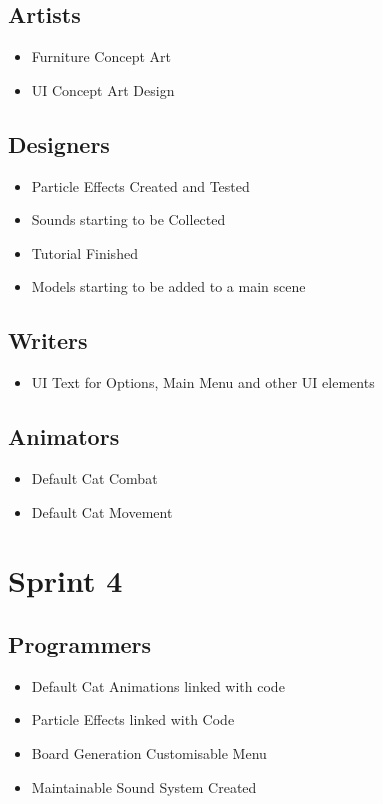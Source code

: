 \documentclass{article}
\begin{document}
\subsection{Artists}
\begin{itemize}
    \item Furniture Concept Art
    \item UI Concept Art Design
\end{itemize}

\subsection{Designers}
\begin{itemize}
    \item Particle Effects Created and Tested
    \item Sounds starting to be Collected
    \item Tutorial Finished
    \item Models starting to be added to a main scene
\end{itemize}{}

\subsection{Writers}
\begin{itemize}
    \item UI Text for Options, Main Menu and other UI elements
\end{itemize}

\subsection{Animators}
\begin{itemize}
    \item Default Cat Combat
    \item Default Cat Movement
\end{itemize}

\newpage
\section{Sprint 4}
\subsection{Programmers}
\begin{itemize}
    \item Default Cat Animations linked with code
    \item Particle Effects linked with Code
    \item Board Generation Customisable Menu
    \item Maintainable Sound System Created
\end{itemize}
\end{document}
